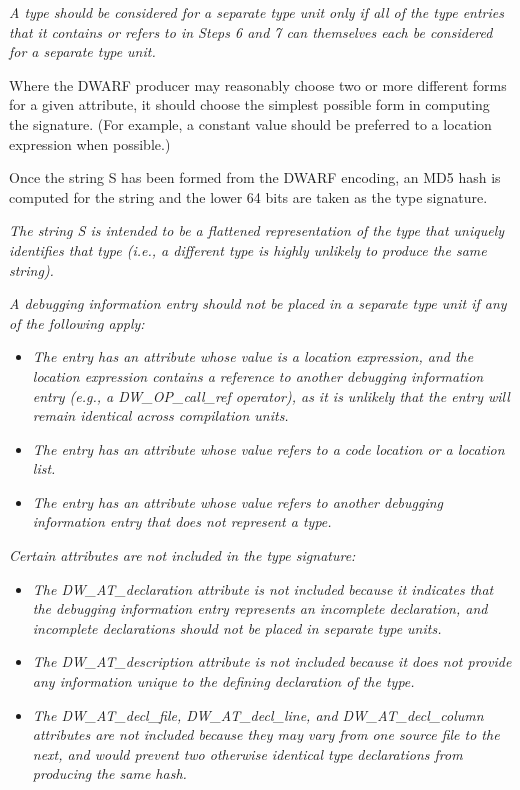 \textit{A type should be considered for a separate type unit only
if all of the type entries that it contains or refers to in
Steps 6 and 7 can themselves each be considered for a separate
type unit.}

Where the DWARF producer may reasonably choose two or more
different forms for a given attribute, it should choose
the simplest possible form in computing the signature. (For
example, a constant value should be preferred to a location
expression when possible.)

Once the string S has been formed from the DWARF encoding,
an MD5 hash is computed for the string and the lower 64 bits
are taken as the type signature.

\textit{The string S is intended to be a flattened representation of
the type that uniquely identifies that type (i.e., a different
type is highly unlikely to produce the same string).}

\textit{A debugging information entry should not be placed in a
separate type unit if any of the following apply:}

\begin{itemize}

\item \textit{The entry has an attribute whose value is a location
expression, and the location expression contains a reference to
another debugging information entry (e.g., a DW\-\_OP\-\_call\-\_ref
operator), as it is unlikely that the entry will remain
identical across compilation units.}

\item \textit{The entry has an attribute whose value refers
to a code location or a location list.}

\item \textit{The entry has an attribute whose value refers
to another debugging information entry that does not represent
a type.}
\end{itemize}


\textit{Certain attributes are not included in the type signature:}

\begin{itemize}
\item \textit{The DW\-\_AT\-\_declaration attribute is not included because it
indicates that the debugging information entry represents an
incomplete declaration, and incomplete declarations should
not be placed in separate type units.}

\item \textit{The DW\-\_AT\-\_description attribute is not included because
it does not provide any information unique to the defining
declaration of the type.}

\item \textit{The DW\-\_AT\-\_decl\-\_file, DW\-\_AT\-\_decl\-\_line, and
DW\-\_AT\-\_decl\-\_column attributes are not included because they
may vary from one source file to the next, and would prevent
two otherwise identical type declarations from producing the
same hash.}

\end{itemize}
